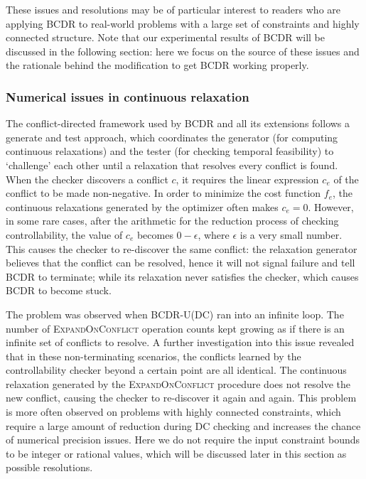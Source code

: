 \documentclass[jair,twoside,11pt,theapa]{article}
\begin{document}
These issues and resolutions may be of particular interest to readers who are
applying BCDR to real-world problems with a large set of constraints and highly
connected structure. Note that our experimental results of BCDR will be
discussed in the following section: here we focus on the source of these
issues and the rationale behind the modification to get BCDR working properly.


\subsubsection{Numerical issues in continuous relaxation}



The conflict-directed framework used by BCDR and all
its extensions follows a generate and test approach, which coordinates
the generator (for computing continuous relaxations) and the tester (for checking
temporal feasibility) to `challenge' each other until a relaxation
that resolves every conflict is found. When the checker discovers a conflict
$c$, it requires the linear expression $c_e$ of the conflict to be made
non-negative. In order to minimize the cost function $f_e$, the continuous
relaxations generated by the optimizer often makes $c_e = 0$. However, in some
rare cases, after the arithmetic for the reduction process of checking
controllability, the value of $c_e$ becomes $0 - \epsilon$, where $\epsilon$ is
a very small number. This causes the checker to re-discover the same conflict:
the relaxation generator believes that the conflict can be resolved, hence it
will not signal failure and tell BCDR to terminate; while its relaxation
never satisfies the checker, which causes BCDR to become stuck.


The problem was observed when BCDR-U(DC) ran into an infinite loop. The number of \textsc{ExpandOnConflict} operation
counts kept growing as if there is an infinite set of conflicts to resolve. A
further investigation into this issue revealed that in these non-terminating
scenarios, the conflicts learned by the controllability checker beyond a certain
point are all identical. The continuous relaxation generated by the
\textsc{ExpandOnConflict} procedure does not resolve the new conflict, causing
the checker to re-discover it again and again. This problem is more often
observed on problems with highly connected constraints, which require a large
amount of reduction during DC checking and increases the chance of numerical
precision issues. Here we do not require the input constraint bounds to be integer or rational values, which will be discussed later in this section as possible resolutions.
\end{document}
